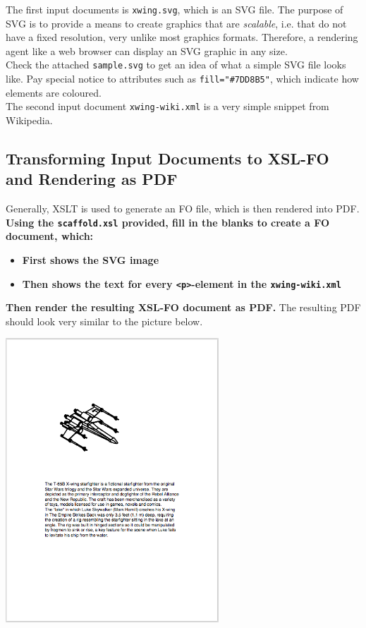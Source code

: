 \documentclass[a4paper, 12pt]{scrartcl}
\begin{document}
The first input documents is \texttt{xwing.svg}, which is an SVG file. The purpose of SVG is to provide a means to create graphics that are \textit{scalable}, i.e. that do not have a fixed resolution, very unlike most graphics formats. Therefore, a rendering agent like a web browser can display an SVG graphic in any size.\\

\noindent Check the attached \texttt{sample.svg} to get an idea of what a simple SVG file looks like. Pay special notice to attributes such as \texttt{fill="\#7DD8B5"}, which indicate how elements are coloured. \\

\noindent The second input document \texttt{xwing-wiki.xml} is a very simple snippet from Wikipedia. \\

\subsection{Transforming Input Documents to XSL-FO and Rendering as PDF}

\noindent Generally, XSLT is used to generate an FO file, which is then rendered into PDF. \\

\noindent \textbf{Using the \texttt{scaffold.xsl} provided, fill in the blanks to create a FO document, which:}

\begin{itemize}
\item \textbf{First shows the SVG image}
\item \textbf{Then shows the text for every \texttt{<p>}-element in the \texttt{xwing-wiki.xml}}
\end{itemize}


\noindent \textbf{Then render the resulting XSL-FO document as PDF.} The resulting PDF should look very similar to the picture below. \\

\begin{center}
\includegraphics[width=8cm]{attachments/picture-below.png}
\end{center}
\end{document}
